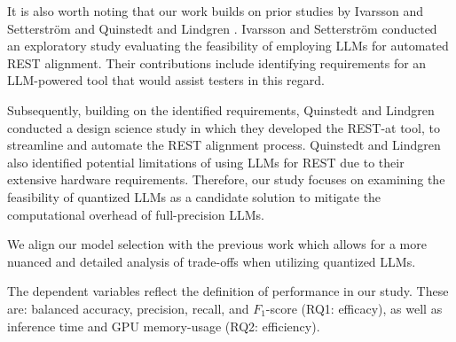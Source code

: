 \documentclass[conference]{IEEEtran}
\begin{document}
\begin{table}[H]
    \centering
    \caption{Mistral-based models specification}
    \label{tab:models}
\end{table}

It is also worth noting that our work builds on prior studies by Ivarsson and Setterström \cite{ivarsson2023automated} and Quinstedt and Lindgren \cite{quinstedt2024Optimizing}. Ivarsson and Setterström conducted an exploratory study evaluating the feasibility of employing LLMs for automated REST alignment. Their contributions include identifying requirements for an LLM-powered tool that would assist testers in this regard. 
 
Subsequently, building on the identified requirements, Quinstedt and Lindgren conducted a design science study in which they developed the REST-at tool, to streamline and automate the REST alignment process. Quinstedt and Lindgren also identified potential limitations of using LLMs for REST due to their extensive hardware requirements. Therefore, our study focuses on examining the feasibility of quantized LLMs as a candidate solution to mitigate the computational overhead of full-precision LLMs.

We align our model selection with the previous work which allows for a more nuanced and detailed analysis of trade-offs when utilizing quantized LLMs.

The dependent variables reflect the definition of performance in our study. These are: balanced accuracy, precision, recall, and $F_1$-score (RQ1: efficacy), as well as inference time and GPU memory-usage (RQ2: efficiency).
\end{document}
